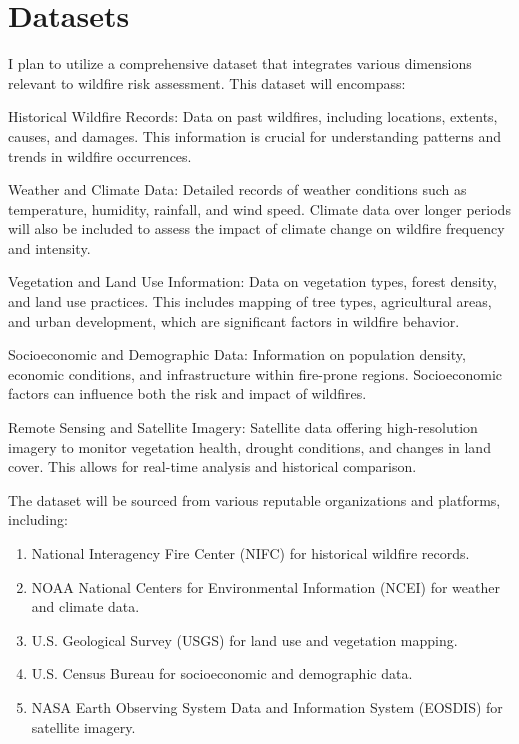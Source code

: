 \section{Datasets}

I plan to utilize a comprehensive dataset that integrates various dimensions relevant to wildfire risk assessment. This dataset will encompass:

Historical Wildfire Records: Data on past wildfires, including locations, extents, causes, and damages. This information is crucial for understanding patterns and trends in wildfire occurrences.

Weather and Climate Data: Detailed records of weather conditions such as temperature, humidity, rainfall, and wind speed. Climate data over longer periods will also be included to assess the impact of climate change on wildfire frequency and intensity.

Vegetation and Land Use Information: Data on vegetation types, forest density, and land use practices. This includes mapping of tree types, agricultural areas, and urban development, which are significant factors in wildfire behavior.

Socioeconomic and Demographic Data: Information on population density, economic conditions, and infrastructure within fire-prone regions. Socioeconomic factors can influence both the risk and impact of wildfires.

Remote Sensing and Satellite Imagery: Satellite data offering high-resolution imagery to monitor vegetation health, drought conditions, and changes in land cover. This allows for real-time analysis and historical comparison.

The dataset will be sourced from various reputable organizations and platforms, including:

\begin{enumerate}
    \item National Interagency Fire Center (NIFC) for historical wildfire records.
    \item NOAA National Centers for Environmental Information (NCEI) for weather and climate data.
    \item U.S. Geological Survey (USGS) for land use and vegetation mapping.
    \item U.S. Census Bureau for socioeconomic and demographic data.
    \item NASA Earth Observing System Data and Information System (EOSDIS) for satellite imagery.
\end{enumerate}



